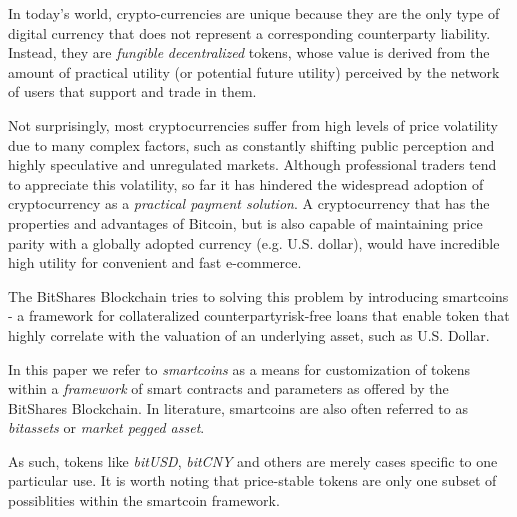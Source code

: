 \label{sec:mpa}
In today's world, crypto-currencies are unique because they are the only type
of digital currency that does not represent a corresponding counterparty
liability. Instead, they are \emph{fungible} \emph{decentralized} tokens, whose
value is derived from the amount of practical utility (or potential future
utility) perceived by the network of users that support and trade in them.

Not surprisingly, most cryptocurrencies suffer from high levels of price
volatility due to many complex factors, such as constantly shifting
public perception and highly speculative and unregulated markets.
Although professional traders tend to appreciate this volatility, so far
it has hindered the widespread adoption of cryptocurrency as a
\emph{practical payment solution}. A cryptocurrency that has the
properties and advantages of Bitcoin, but is also capable of maintaining
price parity with a globally adopted currency (e.g. U.S. dollar), would
have incredible high utility for convenient and fast e-commerce.

The BitShares Blockchain tries to solving this problem by introducing
smartcoins - a framework for collateralized counterpartyrisk-free loans
that enable token that highly correlate with the valuation of an
underlying asset, such as U.S. Dollar.

In this paper we refer to \emph{smartcoins} as a means for customization of
tokens within a \emph{framework} of smart contracts and parameters as offered
by the BitShares Blockchain. In literature, smartcoins are also often referred
to as \emph{bitassets} or \emph{market pegged asset}.

As such, tokens like \emph{bitUSD}, \emph{bitCNY} and others are merely
cases specific to one particular use. It is worth noting that
price-stable tokens are only one subset of possiblities within the
smartcoin framework.
